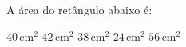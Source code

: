 A \'area do ret\^angulo abaixo \'e:

\parbox{0.35\linewidth}{

$40$\,cm$^2$
$42$\,cm$^2$
$38$\,cm$^2$
$24$\,cm$^2$
$56$\,cm$^2$

}\parbox{0.64\linewidth}{
\begin{center}
\vspace{-6mm}
\vspace{-9mm}
\end{center}
}


